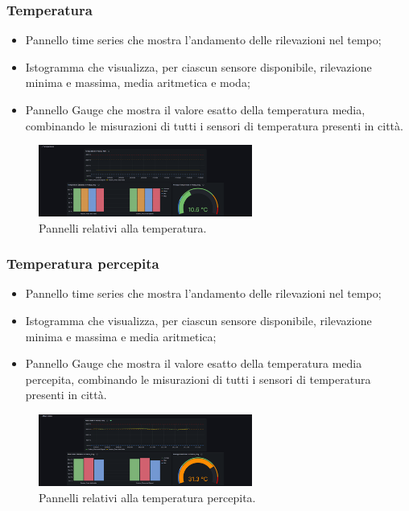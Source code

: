 \documentclass[8pt]{article}
\begin{document}
\subsubsection{Temperatura}
\begin{itemize}
\setlength\itemsep{0em}
    \item Pannello time series che mostra l'andamento delle rilevazioni nel tempo;
    \item Istogramma che visualizza, per ciascun sensore disponibile, rilevazione minima e massima, media aritmetica e moda;
    \item Pannello Gauge che mostra il valore esatto della temperatura media, combinando le misurazioni di tutti i sensori di temperatura presenti in città.
\end{itemize}
\begin{figure}[H]
    \centering
    \includegraphics[width=7cm]{images_mu/temperature.png}
    \caption{Pannelli relativi alla temperatura.}
    \label{fig:Pannelli relativi alla temperatura}
\end{figure}
\subsubsection{Temperatura percepita}
\begin{itemize}
\setlength\itemsep{0em}
    \item Pannello time series che mostra l'andamento delle rilevazioni nel tempo;
    \item Istogramma che visualizza, per ciascun sensore disponibile, rilevazione minima e massima e media aritmetica;
    \item Pannello Gauge che mostra il valore esatto della temperatura media percepita, combinando le misurazioni di tutti i sensori di temperatura presenti in città.
\end{itemize}
\begin{figure}[H]
    \centering
    \includegraphics[width=7cm]{images_mu/heat_index.png}
    \caption{Pannelli relativi alla temperatura percepita.}
    \label{fig:Pannelli relativi alla temperatura percepita}
\end{figure}
\end{document}
